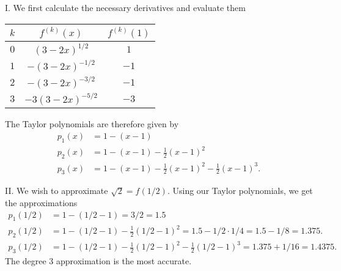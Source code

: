 \documentclass[]{ximera}
\begin{document}
\begin{solution}
I. We first calculate the necessary derivatives and evaluate them
\begin{center}
\begin{tabular}{|c|c|c|}
\hline
$k$ & $f^{(k)}(x)$ & $f^{(k)}(1)$ \\
\hline
$0$ & $(3-2x)^{1/2}$ & $1$ \\
\hline
$1$ & $-(3-2x)^{-1/2}$ & $-1$ \\
\hline
$2$ & $-(3-2x)^{-3/2}$ & $-1$ \\
\hline
$3$ & $-3(3-2x)^{-5/2}$ & $-3$ \\
\hline
\end{tabular}
\end{center}
The Taylor polynomials are therefore given by
\begin{align*}
p_1(x) &= 1 - (x-1) \\
p_2(x) &= 1 - (x-1) - \frac{1}{2}(x-1)^2  \\
p_3(x) &= 1 - (x-1) - \frac{1}{2}(x-1)^2 - \frac{1}{2} (x-1)^3.
\end{align*}

II. We wish to approximate $\sqrt{2} = f(1/2)$. Using our Taylor polynomials, we get the approximations
\begin{align*}
p_1(1/2) &= 1 - (1/2-1) = 3/2 = 1.5 \\
p_2(1/2) &= 1 - (1/2-1) - \frac{1}{2}(1/2-1)^2 = 1.5 - 1/2 \cdot 1/4 = 1.5 - 1/8 = 1.375. \\
p_3(1/2) &= 1 - (1/2-1) - \frac{1}{2}(1/2-1)^2 - \frac{1}{2} (1/2-1)^3  = 1.375 + 1/16 = 1.4375.
\end{align*}
The degree 3 approximation is the most accurate.
\end{solution}
\end{document}
